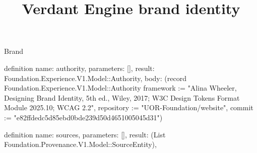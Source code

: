 \begin{lexlean}{Brand}
\title{Verdant Engine brand identity}
\begin{semanticmodule}
definition{
  name: authority,
  parameters: [],
  result: Foundation.Experience.V1.Model::Authority,
  body: (record Foundation.Experience.V1.Model::Authority {framework := "Alina Wheeler, Designing Brand Identity, 5th ed., Wiley, 2017; W3C Design Tokens Format Module 2025.10; WCAG 2.2", repository := "UOR-Foundation/website", commit := "e82ffdedc5d85ebd0bde239d50d4651005045d31"})
}

definition{
  name: sources,
  parameters: [],
  result: (List Foundation.Provenance.V1.Model::SourceEntity),
}
\end{semanticmodule}
\end{lexlean}

